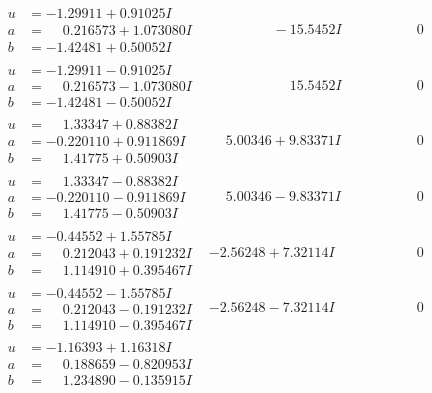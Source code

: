 \documentclass[1p]{elsarticle_modified}
\theoremstyle{definition}
\begin{document}
$$\begin{array}{c|c|c}
\begin{aligned}
u &= -1.29911 + 0.91025 I \\
a &= \phantom{-}0.216573 + 1.073080 I \\
b &= -1.42481 + 0.50052 I\end{aligned}
 & \phantom{-0.000000 } -15.5452 I & \phantom{-0.000000 } 0 \\ \hline\begin{aligned}
u &= -1.29911 - 0.91025 I \\
a &= \phantom{-}0.216573 - 1.073080 I \\
b &= -1.42481 - 0.50052 I\end{aligned}
 & \phantom{-0.000000 -}15.5452 I & \phantom{-0.000000 } 0 \\ \hline\begin{aligned}
u &= \phantom{-}1.33347 + 0.88382 I \\
a &= -0.220110 + 0.911869 I \\
b &= \phantom{-}1.41775 + 0.50903 I\end{aligned}
 & \phantom{-}5.00346 + 9.83371 I & \phantom{-0.000000 } 0 \\ \hline\begin{aligned}
u &= \phantom{-}1.33347 - 0.88382 I \\
a &= -0.220110 - 0.911869 I \\
b &= \phantom{-}1.41775 - 0.50903 I\end{aligned}
 & \phantom{-}5.00346 - 9.83371 I & \phantom{-0.000000 } 0 \\ \hline\begin{aligned}
u &= -0.44552 + 1.55785 I \\
a &= \phantom{-}0.212043 + 0.191232 I \\
b &= \phantom{-}1.114910 + 0.395467 I\end{aligned}
 & -2.56248 + 7.32114 I & \phantom{-0.000000 } 0 \\ \hline\begin{aligned}
u &= -0.44552 - 1.55785 I \\
a &= \phantom{-}0.212043 - 0.191232 I \\
b &= \phantom{-}1.114910 - 0.395467 I\end{aligned}
 & -2.56248 - 7.32114 I & \phantom{-0.000000 } 0 \\ \hline\begin{aligned}
u &= -1.16393 + 1.16318 I \\
a &= \phantom{-}0.188659 - 0.820953 I \\
b &= \phantom{-}1.234890 - 0.135915 I\end{aligned}

\end{array}$$
\end{document}
